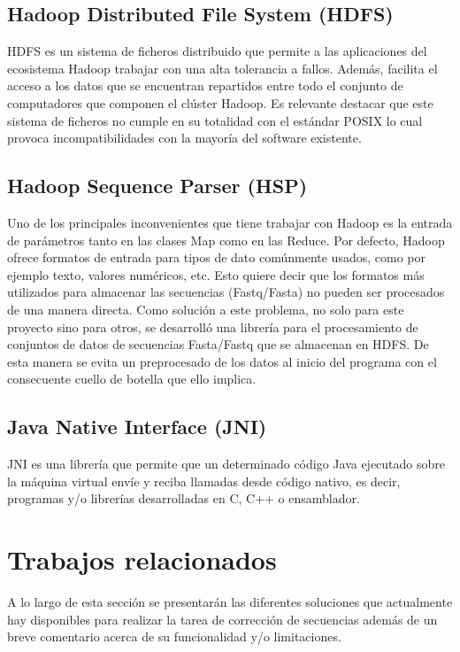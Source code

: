 \documentclass[conference]{IEEEtran}
\begin{document}
\subsection{Hadoop Distributed File System (HDFS)}
HDFS\cite{hadoop_hdfs} es un sistema de ficheros distribuido que permite a las aplicaciones del ecosistema Hadoop trabajar con una alta tolerancia a fallos. Además, facilita el acceso a los datos que se encuentran repartidos entre todo el conjunto de computadores que componen el clúster Hadoop. Es relevante destacar que este sistema de ficheros no cumple en su totalidad con el estándar POSIX lo cual provoca incompatibilidades con la mayoría del software existente.

\subsection{Hadoop Sequence Parser (HSP)}
Uno de los principales inconvenientes que tiene trabajar con Hadoop es la entrada de parámetros tanto en las clases Map como en las Reduce. Por defecto, Hadoop ofrece formatos de entrada para tipos de dato comúnmente usados, como por ejemplo texto, valores numéricos, etc. Esto quiere decir que los formatos más utilizados para almacenar las secuencias (Fastq/Fasta) no pueden ser procesados de una manera directa. Como solución a este problema, no solo para este proyecto sino para otros, se desarrolló una librería para el procesamiento de conjuntos de datos de secuencias Fasta/Fastq que se almacenan en HDFS. De esta manera se evita un preprocesado de los datos al inicio del programa con el consecuente cuello de botella que ello implica.

\subsection{Java Native Interface (JNI)}
JNI\cite{jni} es una librería que permite que un determinado código Java ejecutado sobre la máquina virtual envíe y reciba llamadas desde código nativo, es decir, programas y/o librerías desarrolladas en C, C++ o ensamblador.

\section{Trabajos relacionados}

A lo largo de esta sección se presentarán las diferentes soluciones que actualmente hay disponibles para realizar la tarea de corrección de secuencias además de un breve comentario acerca de su funcionalidad y/o limitaciones.
\end{document}
